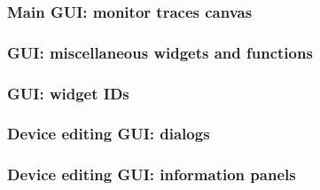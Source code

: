 \documentclass[landscape,twocolumn,a4paper,10pt]{article}
\begin{document}
\subsubsection{Main GUI: monitor traces canvas}


\subsubsection{GUI: miscellaneous widgets and functions}


\subsubsection{GUI: widget IDs}

\subsubsection{Device editing GUI: dialogs}


\subsubsection{Device editing GUI: information panels}



% 
% 
% 
% 
% 
% 
\end{document}
